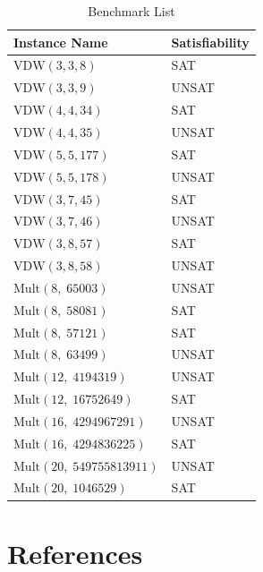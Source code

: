 \documentclass[conference]{IEEEtran}
\begin{document}
\begin{table}[htbp]
\caption{Benchmark List}
\label{tab:benchmarks}
\begin{center}
\begin{tabular}{ll}
\hline
Instance Name & Satisfiability \\
\hline
$\mathrm{VDW}(3, 3, 8)$    & SAT   \\
$\mathrm{VDW}(3, 3, 9)$    & UNSAT \\
$\mathrm{VDW}(4, 4, 34)$   & SAT   \\
$\mathrm{VDW}(4, 4, 35)$   & UNSAT \\
$\mathrm{VDW}(5, 5, 177)$  & SAT   \\
$\mathrm{VDW}(5, 5, 178)$  & UNSAT \\
$\mathrm{VDW}(3, 7, 45)$   & SAT   \\
$\mathrm{VDW}(3, 7, 46)$   & UNSAT \\
$\mathrm{VDW}(3, 8, 57)$   & SAT   \\
$\mathrm{VDW}(3, 8, 58)$   & UNSAT \\
$\mathrm{Mult}(8,\; 65003)$          & UNSAT \\
$\mathrm{Mult}(8,\; 58081)$          & SAT   \\
$\mathrm{Mult}(8,\; 57121)$          & SAT   \\
$\mathrm{Mult}(8,\; 63499)$          & UNSAT \\
$\mathrm{Mult}(12,\; 4194319)$       & UNSAT \\
$\mathrm{Mult}(12,\; 16752649)$      & SAT   \\
$\mathrm{Mult}(16,\; 4294967291)$    & UNSAT \\
$\mathrm{Mult}(16,\; 4294836225)$    & SAT   \\
$\mathrm{Mult}(20,\; 549755813911)$  & UNSAT \\
$\mathrm{Mult}(20,\; 1046529)$       & SAT   \\
\hline
\end{tabular}
\end{center}
\end{table}

\section*{References}
\end{document}
